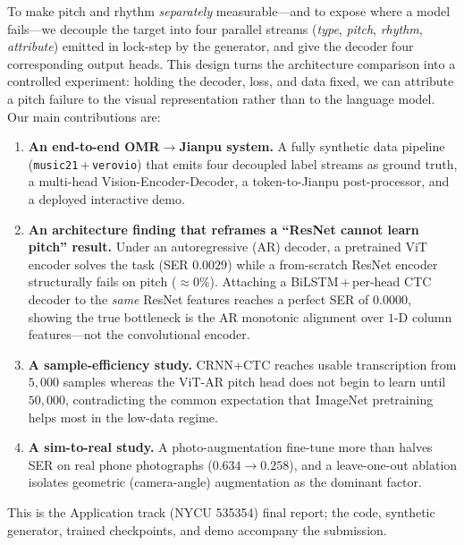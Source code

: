 To make pitch and rhythm \emph{separately} measurable---and to expose where a
model fails---we decouple the target into four parallel streams
(\emph{type}, \emph{pitch}, \emph{rhythm}, \emph{attribute}) emitted in lock-step
by the generator, and give the decoder four corresponding output heads. This
design turns the architecture comparison into a controlled experiment: holding
the decoder, loss, and data fixed, we can attribute a pitch failure to the visual
representation rather than to the language model. Our main contributions are:

\begin{enumerate}
    \item \textbf{An end-to-end OMR$\rightarrow$Jianpu system.} A fully synthetic
    data pipeline (\texttt{music21}\,+\,\texttt{verovio}) that emits four decoupled
    label streams as ground truth, a multi-head Vision-Encoder-Decoder, a
    token-to-Jianpu post-processor, and a deployed interactive demo.
    \item \textbf{An architecture finding that reframes a ``ResNet cannot learn
    pitch'' result.} Under an autoregressive (AR) decoder, a pretrained ViT
    encoder solves the task (SER $0.0029$) while a from-scratch ResNet encoder
    structurally fails on pitch ($\approx0\%$). Attaching a BiLSTM\,+\,per-head CTC
    decoder to the \emph{same} ResNet features reaches a perfect SER of $0.0000$,
    showing the true bottleneck is the AR monotonic alignment over $1$-D column
    features---not the convolutional encoder.
    \item \textbf{A sample-efficiency study.} CRNN+CTC reaches usable transcription
    from $5{,}000$ samples whereas the ViT-AR pitch head does not begin to learn
    until $50{,}000$, contradicting the common expectation that ImageNet
    pretraining helps most in the low-data regime.
    \item \textbf{A sim-to-real study.} A photo-augmentation fine-tune more than
    halves SER on real phone photographs ($0.634\!\to\!0.258$), and a leave-one-out
    ablation isolates geometric (camera-angle) augmentation as the dominant factor.
\end{enumerate}

This is the Application track (NYCU 535354) final report; the code, synthetic
generator, trained checkpoints, and demo accompany the submission.
